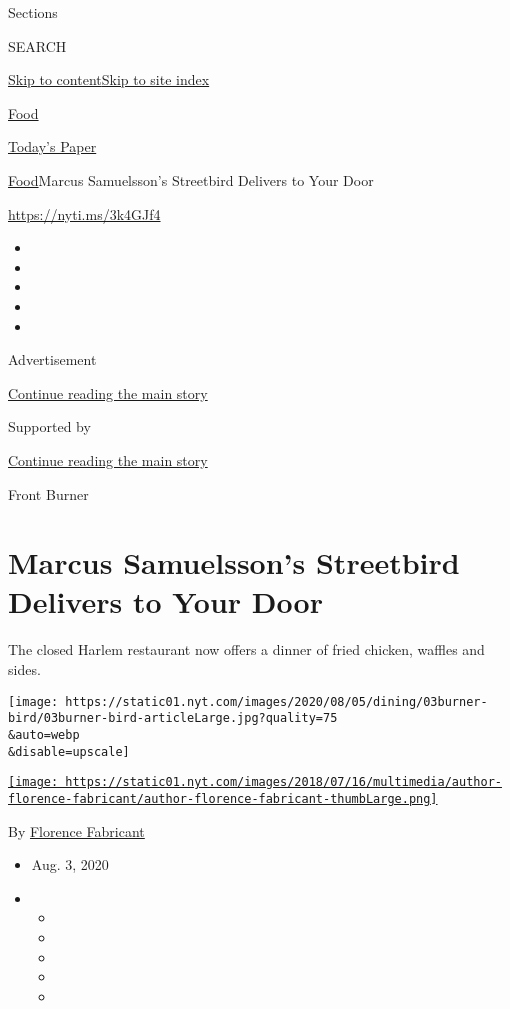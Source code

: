 Sections

SEARCH

\protect\hyperlink{site-content}{Skip to
content}\protect\hyperlink{site-index}{Skip to site index}

\href{https://www.nytimes.com/section/food}{Food}

\href{https://myaccount.nytimes.com/auth/login?response_type=cookie\&client_id=vi}{}

\href{https://www.nytimes.com/section/todayspaper}{Today's Paper}

\href{/section/food}{Food}\textbar{}Marcus Samuelsson's Streetbird
Delivers to Your Door

\url{https://nyti.ms/3k4GJf4}

\begin{itemize}
\item
\item
\item
\item
\item
\end{itemize}

Advertisement

\protect\hyperlink{after-top}{Continue reading the main story}

Supported by

\protect\hyperlink{after-sponsor}{Continue reading the main story}

Front Burner

\hypertarget{marcus-samuelssons-streetbird-delivers-to-your-door}{%
\section{Marcus Samuelsson's Streetbird Delivers to Your
Door}\label{marcus-samuelssons-streetbird-delivers-to-your-door}}

The closed Harlem restaurant now offers a dinner of fried chicken,
waffles and sides.

\texttt{[image: https://static01.nyt.com/images/2020/08/05/dining/03burner-bird/03burner-bird-articleLarge.jpg?quality=75\\\&auto=webp\\\&disable=upscale]}

\href{https://www.nytimes.com/by/florence-fabricant}{\texttt{[image: https://static01.nyt.com/images/2018/07/16/multimedia/author-florence-fabricant/author-florence-fabricant-thumbLarge.png]}}

By \href{https://www.nytimes.com/by/florence-fabricant}{Florence
Fabricant}

\begin{itemize}
\item
  Aug. 3, 2020
\item
  \begin{itemize}
  \item
  \item
  \item
  \item
  \item
  \end{itemize}
\end{itemize}

